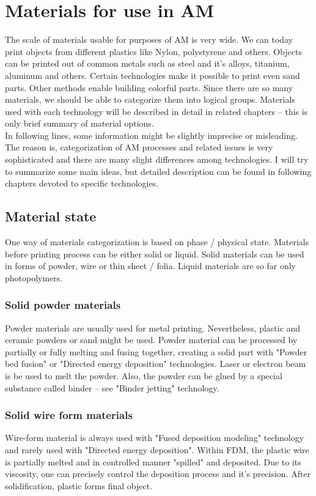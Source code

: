 \documentclass[a4paper, twoside, 11pt]{report}
\begin{document}
\chapter{Materials for use in AM}
The scale of materials usable for purposes of AM is very wide. We can today print objects from different plastics like Nylon, polystyrene and others. Objects can be printed out of common metals such as steel and it's alloys, titanium, aluminum and others. Certain technologies make it possible to print even sand parts. Other methods enable building colorful parts. Since there are so many materials, we should be able to categorize them into logical groups. Materials used with each technology will be described in detail in related chapters – this is only brief summary of material options.\\
In following lines, some information might be slightly imprecise or misleading. The reason is, categorization of AM processes and related issues is very sophisticated and there are many slight differences among technologies. I will try to summarize some main ideas, but detailed description can be found in following chapters devoted to specific technologies.\\

\section{Material state}
One way of materials categorization is based on phase / physical state. Materials before printing process can be either solid or liquid. Solid materials can be used in forms of powder, wire or thin sheet / folia. Liquid materials are so far only photopolymers.
\subsection{Solid powder materials}
Powder materials are usually used for metal printing. Nevertheless, plastic and ceramic powders or sand might be used. Powder material can be processed by partially or fully melting and fusing together, creating a solid part with "Powder bed fusion" or "Directed energy deposition" technologies. Laser or electron beam is be used to melt the powder. Also, the powder can be glued by a special substance called binder – see "Binder jetting" technology. 
\subsection{Solid wire form materials}
Wire-form material is always used with "Fused deposition modeling" technology and rarely used with "Directed energy deposition". Within FDM, the plastic wire is partially melted and in controlled manner "spilled" and deposited. Due to its viscosity, one can precisely control the deposition process and it's precision. After solidification, plastic forms final object.
\end{document}

